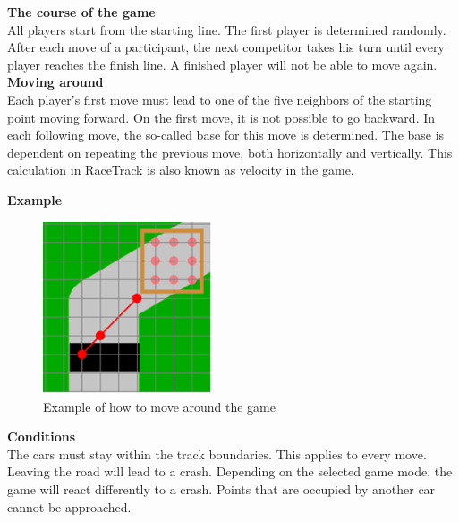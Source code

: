             \textbf{The course of the game} \\
            All players start from the starting line. The first player is determined randomly. After each move of a participant, the next competitor takes his turn until every player reaches the finish line. A finished player will not be able to move again. \\

            \textbf{Moving around} \\
            Each player's first move must lead to one of the five neighbors of the starting point moving forward. On the first move, it is not possible to go backward. In each following move, the so-called base for this move is determined. The base is dependent on repeating the previous move, both horizontally and vertically. This calculation in RaceTrack is also known as velocity in the game. \\

            \newpage

            \textbf{Example} \\
            \begin{figure}[H]
                \centering
                \includegraphics[width=5cm,keepaspectratio,center]{img/Additional-Requirements_Moving-Around-Example.png}
                \caption{Example of how to move around the game}
            \end{figure}

            \textbf{Conditions} \\
            The cars must stay within the track boundaries. This applies to every move. Leaving the road will lead to a crash. Depending on the selected game mode, the game will react differently to a crash. Points that are occupied by another car cannot be approached. \\

